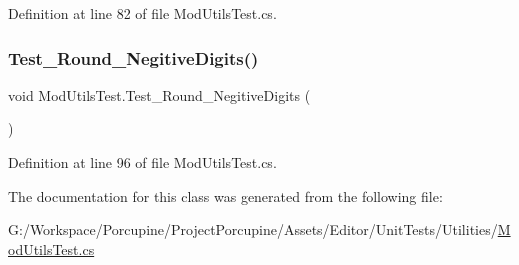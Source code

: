 Definition at line 82 of file Mod\+Utils\+Test.\+cs.

\mbox{\label{class_mod_utils_test_ac373bf7be6986cc8adc0a03eda50ee79}} 
\subsubsection{\texorpdfstring{Test\+\_\+\+Round\+\_\+\+Negitive\+Digits()}{Test\_Round\_NegitiveDigits()}}
{\footnotesize\ttfamily void Mod\+Utils\+Test.\+Test\+\_\+\+Round\+\_\+\+Negitive\+Digits (\begin{DoxyParamCaption}{ }\end{DoxyParamCaption})}



Definition at line 96 of file Mod\+Utils\+Test.\+cs.



The documentation for this class was generated from the following file\+:\begin{DoxyCompactItemize}
\item 
G\+:/\+Workspace/\+Porcupine/\+Project\+Porcupine/\+Assets/\+Editor/\+Unit\+Tests/\+Utilities/\hyperlink{_mod_utils_test_8cs}{Mod\+Utils\+Test.\+cs}\end{DoxyCompactItemize}

